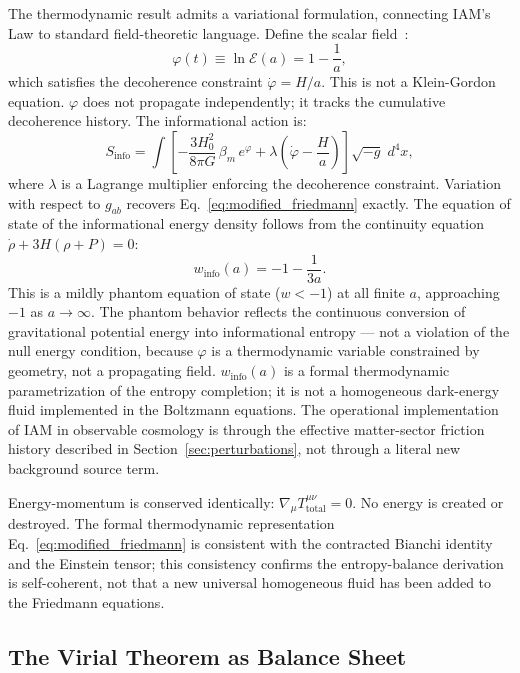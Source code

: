 \documentclass[12pt,a4paper]{article}
\begin{document}
The thermodynamic result admits a variational formulation, connecting
IAM's Law to standard field-theoretic language. Define the scalar
field~\citep{IAM_archive}:
\begin{equation}
\varphi(t) \equiv \ln\mathcal{E}(a) = 1 - \frac{1}{a},
\label{eq:phi_def}
\end{equation}
which satisfies the decoherence constraint $\dot{\varphi} = H/a$.
This is not a Klein-Gordon equation. $\varphi$ does not propagate
independently; it tracks the cumulative decoherence history. The
informational action is:
\begin{equation}
S_\mathrm{info} = \int\!\left[
  -\frac{3H_0^2}{8\pi G}\,\beta_m\,e^{\varphi}
  + \lambda\!\left(\dot{\varphi} - \frac{H}{a}\right)
\right]\!\sqrt{-g}\;d^4x,
\label{eq:Sinfo}
\end{equation}
where $\lambda$ is a Lagrange multiplier enforcing the decoherence
constraint. Variation with respect to $g_{ab}$ recovers
Eq.~\eqref{eq:modified_friedmann} exactly. The equation of state
of the informational energy density follows from the continuity
equation $\dot{\rho} + 3H(\rho + P) = 0$:
\begin{equation}
w_\mathrm{info}(a) = -1 - \frac{1}{3a}.
\label{eq:w_info}
\end{equation}
This is a mildly phantom equation of state ($w < -1$) at all finite
$a$, approaching $-1$ as $a \to \infty$. The phantom behavior
reflects the continuous conversion of gravitational potential energy
into informational entropy --- not a violation of the null energy
condition, because $\varphi$ is a thermodynamic variable constrained
by geometry, not a propagating field. $w_\mathrm{info}(a)$ is a
formal thermodynamic parametrization of the entropy completion; it
is not a homogeneous dark-energy fluid implemented in the Boltzmann
equations. The operational implementation of IAM in observable
cosmology is through the effective matter-sector friction history
described in Section~\ref{sec:perturbations}, not through a literal
new background source term.

Energy-momentum is conserved identically:
$\nabla_\mu T^{\mu\nu}_\mathrm{total} = 0$. No energy is created or
destroyed. The formal thermodynamic representation
Eq.~\eqref{eq:modified_friedmann} is consistent with the contracted
Bianchi identity and the Einstein tensor; this consistency confirms
the entropy-balance derivation is self-coherent, not that a new
universal homogeneous fluid has been added to the Friedmann equations.

\subsection{The Virial Theorem as Balance Sheet}
\end{document}
